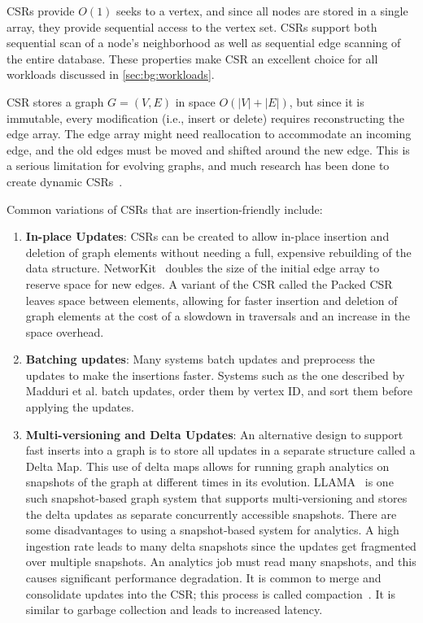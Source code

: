 CSRs provide $O(1)$ seeks to a vertex, and since all nodes are stored in a single array, they provide sequential access to the vertex set.
CSRs support both sequential scan of a node's neighborhood as well as sequential edge scanning of the entire database.
These properties make CSR an excellent choice for all workloads discussed in \autoref{sec:bg:workloads}.

CSR stores a graph $G = (V, E)$ in space $O(|V| + |E|)$, but since it is immutable, every modification (i.e., insert or delete) requires reconstructing the edge array.
The edge array might need reallocation to accommodate an incoming edge, and the old edges must be moved and shifted around the new edge.
This is a serious limitation for evolving graphs, and much research has been done to create dynamic CSRs~\cite{staudt2014networkit, PackedCSR, csr++2020Firmli, llama, madduri2009compact}.

Common variations of CSRs that are insertion-friendly include:
\begin{enumerate}
    \item \textbf{In-place Updates}: CSRs can be created to allow in-place insertion and deletion of graph elements without needing a full, expensive rebuilding of the data structure.
    NetworKit~\cite{staudt2014networkit} doubles the size of the initial edge array to reserve space for new edges. 
    A variant of the CSR called the Packed CSR \cite{PackedCSR} leaves space between elements, allowing for faster insertion and deletion of graph elements at the cost of a slowdown in traversals and an increase in the space overhead. 
    \item \textbf{Batching updates}: Many systems batch updates and preprocess the updates to make the insertions faster.
    Systems such as the one described by Madduri et al. \cite{madduri2009compact} batch updates, order them by vertex ID, and sort them before applying the updates.
    \item \textbf{Multi-versioning and Delta Updates}: An alternative design to support fast inserts into a graph is to store all updates in a separate structure called a Delta Map.
    This use of delta maps allows for running graph analytics on snapshots of the graph at different times in its evolution.
    LLAMA~\cite{llama} is one such snapshot-based graph system that supports multi-versioning and stores the delta updates as separate concurrently accessible snapshots. 
    There are some disadvantages to using a snapshot-based system for analytics. 
    A high ingestion rate leads to many delta snapshots since the updates get fragmented over multiple snapshots.
    An analytics job must read many snapshots, and this causes significant performance degradation.
    It is common to merge and consolidate updates into the CSR; this process is called compaction~\cite{csr++2020Firmli,llama}. It is similar to garbage collection and leads to increased latency.
\end{enumerate}

